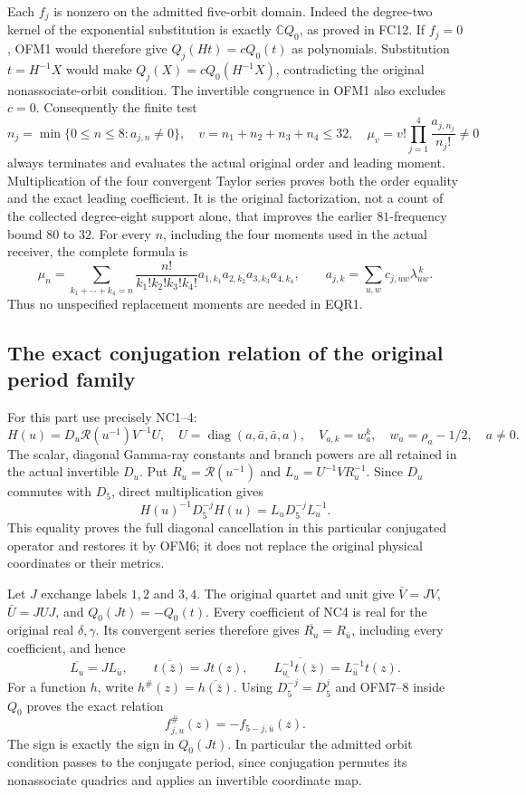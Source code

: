 Each $f_j$ is nonzero on the admitted five-orbit domain. Indeed the
degree-two kernel of the exponential substitution is exactly
$\mathbb C Q_0$, as proved in FC12. If $f_j=0$, OFM1 would therefore
give $Q_j(Ht)=cQ_0(t)$ as polynomials. Substitution $t=H^{-1}X$
would make $Q_j(X)=cQ_0(H^{-1}X)$, contradicting the original
nonassociate-orbit condition. The invertible congruence in OFM1 also
excludes $c=0$. Consequently the finite test
\[
 n_j=\min\{0\le n\le8:a_{j,n}\ne0\},\quad
 v=n_1+n_2+n_3+n_4\le32,\quad
 \boxed{\mu_v=v!\prod_{j=1}^4\frac{a_{j,n_j}}{n_j!}\ne0}
 \tag{OFM4}
\]
always terminates and evaluates the actual original order and leading
moment. Multiplication of the four convergent Taylor series proves
both the order equality and the exact leading coefficient. It is the
original factorization, not a count of the collected degree-eight
support alone, that improves the earlier $81$-frequency bound $80$ to $32$.
For every $n$, including the four moments used in the actual receiver,
the complete formula is
\[
 \mu_n=\sum_{k_1+\cdots+k_4=n}
       \frac{n!}{k_1!k_2!k_3!k_4!}
       a_{1,k_1}a_{2,k_2}a_{3,k_3}a_{4,k_4},\qquad
 a_{j,k}=\sum_{u,w}c_{j,uw}\lambda_{uw}^{\,k}.
 \tag{OFM5}
\]
Thus no unspecified replacement moments are needed in EQR1.

\subsection{The exact conjugation relation of the original period family}
For this part use precisely NC1--4:
\[
 H(u)=D_u\mathcal R(u^{-1})V^{-1}U,\quad
 U=\operatorname{diag}(a,\bar a,\bar a,a),\quad
 V_{a,k}=w_a^k,\quad w_a=\rho_a-1/2,
 \quad a\ne0.
 \tag{OFM6}
\]
The scalar, diagonal Gamma-ray constants and branch powers are all
retained in the actual invertible $D_u$. Put
$R_u=\mathcal R(u^{-1})$ and $L_u=U^{-1}VR_u^{-1}$.
Since $D_u$ commutes with $D_5$, direct multiplication gives
\[
 H(u)^{-1}D_5^{-j}H(u)=L_uD_5^{-j}L_u^{-1}.
 \tag{OFM7}
\]
This equality proves the full diagonal cancellation in this particular
conjugated operator and restores it by OFM6; it does not replace the
original physical coordinates or their metrics.

Let $J$ exchange labels $1,2$ and $3,4$. The original quartet and
unit give $\bar V=JV$, $\bar U=JUJ$, and $Q_0(Jt)=-Q_0(t)$.
Every coefficient of NC4 is real for the original real $\delta,\gamma$.
Its convergent series therefore gives
$\overline{R_u}=R_{\bar u}$, including every coefficient, and hence
\[
 \overline{L_u}=J L_{\bar u},\qquad
 \overline{t(\bar z)}=Jt(z),\qquad
 \overline{L_u^{-1}t(\bar z)}=L_{\bar u}^{-1}t(z).
 \tag{OFM8}
\]
For a function $h$, write $h^\#(z)=\overline{h(\bar z)}$.
Using $\overline{D_5^{-j}}=D_5^j$ and OFM7--8 inside $Q_0$
proves the exact relation
\[
 f_{j,u}^{\#}(z)=-f_{5-j,\bar u}(z).
 \tag{OFM9}
\]
The sign is exactly the sign in $Q_0(Jt)$. In particular the
admitted orbit condition passes to the conjugate period, since
conjugation permutes its nonassociate quadrics and applies an
invertible coordinate map.

